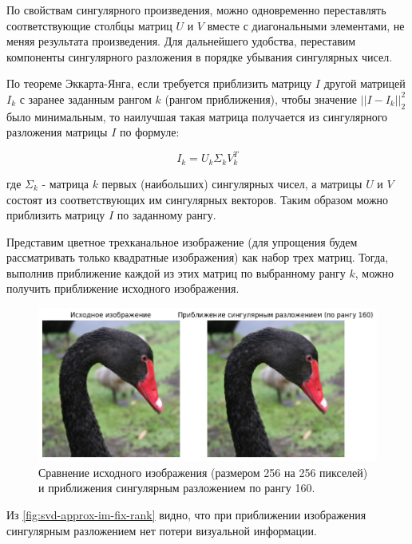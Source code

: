 По свойствам сингулярного произведения, можно одновременно переставлять соответствующие столбцы матриц $U$ и $V$ вместе с диагональными элементами, не меняя результата произведения. Для дальнейшего удобства, переставим компоненты сингулярного разложения в порядке убывания сингулярных чисел.


По теореме Эккарта-Янга\cite{eckart_young}, если требуется приблизить матрицу $I$ другой матрицей $I_k$ с заранее заданным рангом $k$ (рангом приближения), чтобы значение $||I - I_k||_2^2$ было минимальным, то наилучшая такая матрица получается из сингулярного разложения матрицы $I$ по формуле:

$$
I_k = U_k\Sigma_kV_k^T
$$

где $\Sigma_k$ - матрица $k$ первых (наибольших) сингулярных чисел, а матрицы $U$ и $V$ состоят из соответствующих им сингулярных векторов. Таким образом можно приблизить матрицу $I$ по заданному рангу. 

Представим цветное трехканальное изображение (для упрощения будем рассматривать только квадратные изображения) как набор трех матриц. Тогда, выполнив приближение каждой из этих матриц по выбранному рангу $k$, можно получить приближение исходного изображения.

\begin{figure}[H]
    \centering
    \includegraphics[width=1.0\textwidth]
    {images/solutions_analysis/svd/svd_approx_im_160rank.png}
    \caption{Сравнение исходного изображения (размером 256 на 256 пикселей) и приближения сингулярным разложением по рангу 160.}
    \label{fig:svd-approx-im-fix-rank}
\end{figure}

Из \autoref{fig:svd-approx-im-fix-rank} видно, что при приближении изображения сингулярным разложением нет потери визуальной информации.

